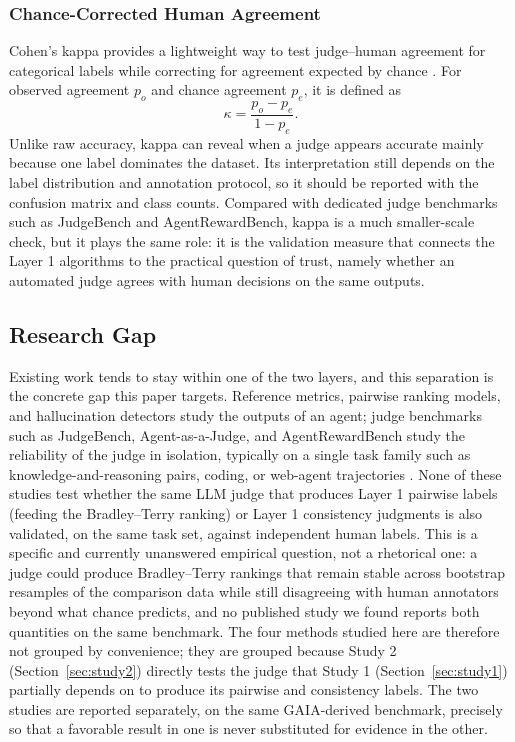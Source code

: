 \documentclass[conference]{IEEEtran}
\begin{document}
\subsubsection{Chance-Corrected Human Agreement}
Cohen's kappa provides a lightweight way to test judge--human agreement for categorical labels while correcting for agreement expected by chance \cite{cohen1960coefficient}. For observed agreement $p_o$ and chance agreement $p_e$, it is defined as
\begin{equation}
\kappa=\frac{p_o-p_e}{1-p_e}.
\end{equation}
Unlike raw accuracy, kappa can reveal when a judge appears accurate mainly because one label dominates the dataset. Its interpretation still depends on the label distribution and annotation protocol, so it should be reported with the confusion matrix and class counts. Compared with dedicated judge benchmarks such as JudgeBench and AgentRewardBench, kappa is a much smaller-scale check, but it plays the same role: it is the validation measure that connects the Layer 1 algorithms to the practical question of trust, namely whether an automated judge agrees with human decisions on the same outputs.

\subsection{Research Gap}
Existing work tends to stay within one of the two layers, and this separation is the concrete gap this paper targets. Reference metrics, pairwise ranking models, and hallucination detectors study the outputs of an agent; judge benchmarks such as JudgeBench, Agent-as-a-Judge, and AgentRewardBench study the reliability of the judge in isolation, typically on a single task family such as knowledge-and-reasoning pairs, coding, or web-agent trajectories \cite{tan2025judgebench,zhuge2024agentasjudge,lu2025agentrewardbench}. None of these studies test whether the same LLM judge that produces Layer 1 pairwise labels (feeding the Bradley--Terry ranking) or Layer 1 consistency judgments is also validated, on the same task set, against independent human labels. This is a specific and currently unanswered empirical question, not a rhetorical one: a judge could produce Bradley--Terry rankings that remain stable across bootstrap resamples of the comparison data while still disagreeing with human annotators beyond what chance predicts, and no published study we found reports both quantities on the same benchmark. The four methods studied here are therefore not grouped by convenience; they are grouped because Study 2 (Section~\ref{sec:study2}) directly tests the judge that Study 1 (Section~\ref{sec:study1}) partially depends on to produce its pairwise and consistency labels. The two studies are reported separately, on the same GAIA-derived benchmark, precisely so that a favorable result in one is never substituted for evidence in the other.
\end{document}
